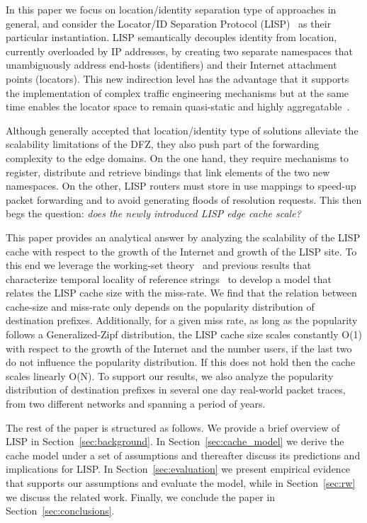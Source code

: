\documentclass[twocolumn, 10pt]{article}
\theoremstyle{plain}
\begin{document}
In this paper we focus on location/identity separation type of approaches in
general, and  consider the Locator/ID Separation Protocol
(LISP)~\cite{saucez:lisp} as their particular instantiation. LISP semantically
decouples identity from location, currently overloaded by IP addresses, by
creating two separate namespaces that unambiguously address end-hosts
(identifiers) and their Internet attachment points (locators). This new
indirection level has the advantage that it supports the implementation of
complex traffic engineering mechanisms but at the same time enables the
locator space to remain quasi-static and highly
aggregatable~\cite{rfc7215}. 



Although generally accepted that location/identity type of solutions alleviate the
scalability limitations of the DFZ, they also push part of the forwarding
complexity to the edge domains. On the one hand, they require mechanisms to
register, distribute and retrieve bindings that link elements of the two new
namespaces. On the other, LISP routers must store in use mappings to speed-up
packet forwarding and to avoid generating floods of resolution requests. 
This then begs the question: \emph{does the newly introduced LISP edge cache
scale?}




This paper provides an analytical answer by analyzing the scalability of the
LISP cache with respect to the growth of the Internet and growth of the LISP
site. To this end we leverage the working-set theory~\cite{denning:ws_model}
and previous results that characterize temporal locality of reference
strings~\cite{breslau:web_and_zipf, jin:web_tloc} to develop a model that
relates the LISP cache size with the miss-rate. We find that the relation
between cache-size and miss-rate only depends on the popularity distribution
of destination prefixes. Additionally, for a given miss rate, as long as the
popularity follows a Generalized-Zipf distribution, the LISP cache size scales
constantly O(1) with respect to the growth of the Internet and the number
users, if the last two do not influence the popularity distribution. If this
does not hold then the cache scales linearly O(N). To support our results, we
also analyze the popularity distribution of destination prefixes in several one day
real-world packet traces, from two different networks and spanning a period of
 years.

The rest of the paper is structured as follows. We provide a brief overview of
LISP in Section~\ref{sec:background}. In Section~\ref{sec:cache_model} we
derive the cache model under a set of assumptions and thereafter discuss its
predictions and implications for LISP.  In Section~\ref{sec:evaluation}
we present empirical evidence that supports our assumptions and evaluate the
model, while in Section~\ref{sec:rw} we discuss the related work. Finally, we
conclude the paper in Section~\ref{sec:conclusions}.
 
\end{document}
